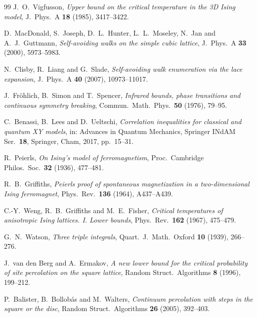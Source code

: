 \begin{thebibliography}{99}
J.~O.~Vigfusson,
\emph{Upper bound on the critical temperature in the 3D Ising model},
J.\ Phys.\ A \textbf{18} (1985), 3417--3422. 

D.~MacDonald, S.~Joseph, D.~L.~Hunter, L.~L.~Moseley, N.~Jan and A.~J.~Guttmann,
\emph{Self-avoiding walks on the simple cubic lattice},
J.\ Phys.\ A \textbf{33} (2000), 5973--5983. 

N.~Clisby, R.~Liang and G.~Slade,
\emph{Self-avoiding walk enumeration via the lace expansion},
J.\ Phys.\ A \textbf{40} (2007), 10973--11017. 

J.~Fr\"ohlich, B.~Simon and T.~Spencer,
\emph{Infrared bounds, phase transitions and continuous symmetry breaking},
Commun.\ Math.\ Phys.\ \textbf{50} (1976), 79--95. 

C.~Benassi, B.~Lees and D.~Ueltschi,
\emph{Correlation inequalities for classical and quantum XY models},
in: Advances in Quantum Mechanics, Springer INdAM Ser.\ \textbf{18}, Springer, Cham, 2017, pp.~15--31. 

R.~Peierls,
\emph{On Ising's model of ferromagnetism},
Proc.\ Cambridge Philos.\ Soc.\ \textbf{32} (1936), 477--481. 

R.~B.~Griffiths,
\emph{Peierls proof of spontaneous magnetization in a two-dimensional Ising ferromagnet},
Phys.\ Rev.\ \textbf{136} (1964), A437--A439. 

C.-Y.~Weng, R.~B.~Griffiths and M.~E.~Fisher,
\emph{Critical temperatures of anisotropic Ising lattices. I. Lower bounds},
Phys.\ Rev.\ \textbf{162} (1967), 475--479. 

G.~N.~Watson,
\emph{Three triple integrals},
Quart.\ J.\ Math.\ Oxford \textbf{10} (1939), 266--276. 

J.~van den Berg and A.~Ermakov,
\emph{A new lower bound for the critical probability of site percolation on the square lattice},
Random Struct.\ Algorithms \textbf{8} (1996), 199--212. 

P.~Balister, B.~Bollob\'as and M.~Walters,
\emph{Continuum percolation with steps in the square or the disc},
Random Struct.\ Algorithms \textbf{26} (2005), 392--403. 


\end{thebibliography}
